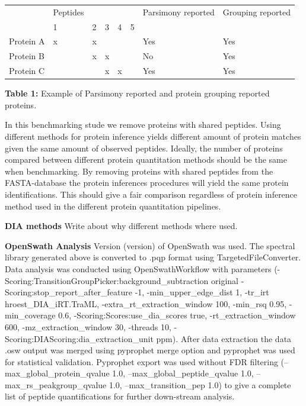 \documentclass[10pt,letterpaper]{article}
\begin{document}
\begin{table}[!htbp]
\begin{tabular}{llllllll}
          & Peptides &   &   &   &   & Parsimony reported & Grouping reported \\
          & 1        & 2 & 3 & 4 & 5 &                    &                   \\
Protein A & x        & x &   &   &   & Yes                & Yes               \\
Protein B &          & x & x &   &   & No                 & Yes               \\
Protein C &          &   & x & x &   & Yes                & Yes              	
\end{tabular}
\newline
\textbf{Table 1:} Example of Parsimony reported and protein grouping reported proteins.
\end{table}

In this benchmarking stude we remove proteins with shared peptides. Using different methods for protein inference yields different amount of protein matches given the same amount of observed peptides. Ideally, the number of proteins compared between different protein quantitation methods should be the same when benchmarking. By removing proteins with shared peptides from the FASTA-database the protein inferences procedures will yield the same protein identifications. This should give a fair comparison regardless of protein inference method used in the different protein quantitation pipelines.

\textbf{DIA methods}
Write about why different methods where used.

\textbf{OpenSwath Analysis}
Version (version) of OpenSwath was used. The spectral library generated above is converted to .pqp format using TargetedFileConverter. Data analysis was conducted using OpenSwathWorkflow with parameters (-Scoring:TransitionGroupPicker:background\_subtraction original -Scoring:stop\_report\_after\_feature -1, -min\_upper\_edge\_dist 1, -tr\_irt hroest\_DIA\_iRT.TraML, -extra\_rt\_extraction\_window 100, -min\_rsq 0.95, -min\_coverage 0.6, -Scoring:Scores:use\_dia\_scores true, -rt\_extraction\_window 600, -mz\_extraction\_window 30, -threads 10, -Scoring:DIAScoring:dia\_extraction\_unit ppm). After data extraction the data .osw output was merged using pyprophet merge option and pyprophet was used for statistical validation. Pyprophet export was used without FDR filtering (--max\_global\_protein\_qvalue 1.0, --max\_global\_peptide\_qvalue 1.0, --max\_rs\_peakgroup\_qvalue 1.0, --max\_transition\_pep 1.0) to give a complete list of peptide quantifications for further down-stream analysis.
\end{document}
